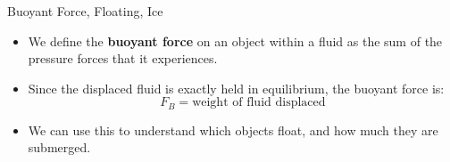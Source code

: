 \documentclass[12pt]{beamer}
\begin{document}
\begin{frame}{Buoyant Force, Floating, Ice}

\begin{itemize}
\item We define the {\bf buoyant force} on an object within a fluid as the sum of the pressure forces that it experiences.
\item Since the displaced fluid is exactly held in equilibrium, the buoyant force is:
	\begin{equation*}
	F_B = \text{weight of fluid displaced}
	\end{equation*}
\item We can use this to understand which objects float, and how much they are submerged.
\end{itemize}


\end{frame}
\end{document}
